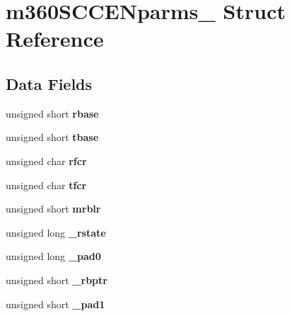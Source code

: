 \hypertarget{structm360SCCENparms__}{}\section{m360\+S\+C\+C\+E\+Nparms\+\_\+ Struct Reference}
\label{structm360SCCENparms__}
\subsection*{Data Fields}
\begin{DoxyCompactItemize}
\item 
\mbox{\label{structm360SCCENparms___a7909c33b6415b8ec9460b8918d12ad07}} 
unsigned short {\bfseries rbase}
\item 
\mbox{\label{structm360SCCENparms___ab147c9286ec5d1c7fc6b8ad41ee79067}} 
unsigned short {\bfseries tbase}
\item 
\mbox{\label{structm360SCCENparms___a42cf2d3239bb8e3ae7c8e23b82bad068}} 
unsigned char {\bfseries rfcr}
\item 
\mbox{\label{structm360SCCENparms___a6cea76351735eb088eae0eefcb901cb5}} 
unsigned char {\bfseries tfcr}
\item 
\mbox{\label{structm360SCCENparms___a22a1ee8e5bff9002f7b79aa4ad4bc8bf}} 
unsigned short {\bfseries mrblr}
\item 
\mbox{\label{structm360SCCENparms___abaa03eb6be0fee7f28a9c1cc68867a37}} 
unsigned long {\bfseries \+\_\+rstate}
\item 
\mbox{\label{structm360SCCENparms___acd4ee1693a5560998e9807212d3f44ff}} 
unsigned long {\bfseries \+\_\+pad0}
\item 
\mbox{\label{structm360SCCENparms___a00489c8a6bc3e88fee48371ccb1a2ca9}} 
unsigned short {\bfseries \+\_\+rbptr}
\item 
\mbox{\label{structm360SCCENparms___a6f6cdedb3eed5891b223ae8848968168}} 
unsigned short {\bfseries \+\_\+pad1}

\end{DoxyCompactItemize}
